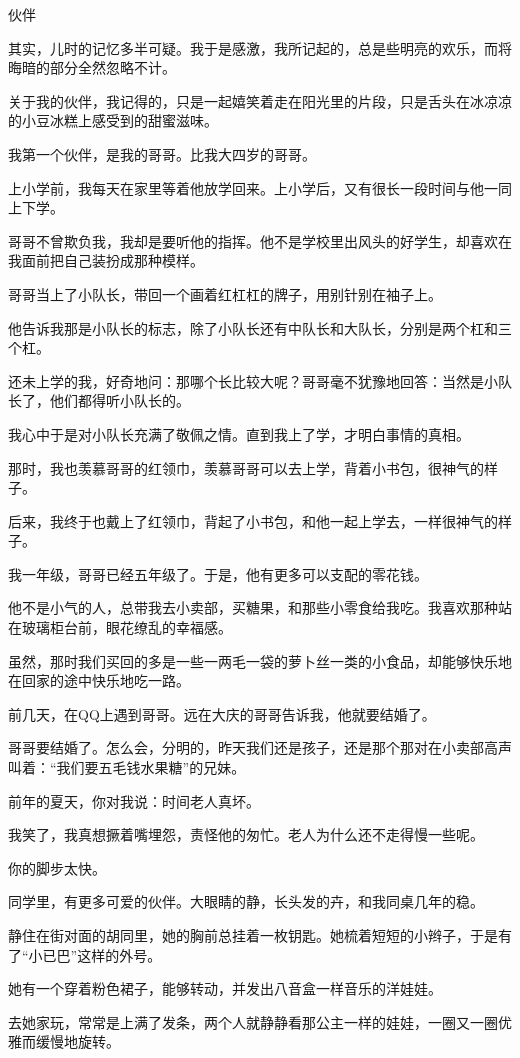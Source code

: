 \documentclass[12pt,a4paper]{article}
\newcommand{\subpart}[1]{
	\begingroup \par
	\vspace{1ex} \centering #1
	\par \endgroup \nopagebreak[4]
}
\begin{document}
		\subpart{伙伴}

		其实，儿时的记忆多半可疑。我于是感激，我所记起的，总是些明亮的欢乐，而将晦暗的部分全然忽略不计。\par
		关于我的伙伴，我记得的，只是一起嬉笑着走在阳光里的片段，只是舌头在冰凉凉的小豆冰糕上感受到的甜蜜滋味。

		我第一个伙伴，是我的哥哥。比我大四岁的哥哥。\par
		上小学前，我每天在家里等着他放学回来。上小学后，又有很长一段时间与他一同上下学。\par
		哥哥不曾欺负我，我却是要听他的指挥。他不是学校里出风头的好学生，却喜欢在我面前把自己装扮成那种模样。\par
		哥哥当上了小队长，带回一个画着红杠杠的牌子，用别针别在袖子上。\par
		他告诉我那是小队长的标志，除了小队长还有中队长和大队长，分别是两个杠和三个杠。\par
		还未上学的我，好奇地问：那哪个长比较大呢？哥哥毫不犹豫地回答：当然是小队长了，他们都得听小队长的。\par
		我心中于是对小队长充满了敬佩之情。直到我上了学，才明白事情的真相。

		那时，我也羡慕哥哥的红领巾，羡慕哥哥可以去上学，背着小书包，很神气的样子。\par
		后来，我终于也戴上了红领巾，背起了小书包，和他一起上学去，一样很神气的样子。

		我一年级，哥哥已经五年级了。于是，他有更多可以支配的零花钱。\par
		他不是小气的人，总带我去小卖部，买糖果，和那些小零食给我吃。我喜欢那种站在玻璃柜台前，眼花缭乱的幸福感。\par
		虽然，那时我们买回的多是一些一两毛一袋的萝卜丝一类的小食品，却能够快乐地在回家的途中快乐地吃一路。

		前几天，在QQ上遇到哥哥。远在大庆的哥哥告诉我，他就要结婚了。\par
		哥哥要结婚了。怎么会，分明的，昨天我们还是孩子，还是那个那对在小卖部高声叫着：“我们要五毛钱水果糖”的兄妹。\par
		前年的夏天，你对我说：时间老人真坏。\par
		我笑了，我真想撅着嘴埋怨，责怪他的匆忙。老人为什么还不走得慢一些呢。\par
		你的脚步太快。

		同学里，有更多可爱的伙伴。大眼睛的静，长头发的卉，和我同桌几年的稳。

		静住在街对面的胡同里，她的胸前总挂着一枚钥匙。她梳着短短的小辫子，于是有了“小已巴”这样的外号。\par
		她有一个穿着粉色裙子，能够转动，并发出八音盒一样音乐的洋娃娃。\par
		去她家玩，常常是上满了发条，两个人就静静看那公主一样的娃娃，一圈又一圈优雅而缓慢地旋转。
\end{document}
